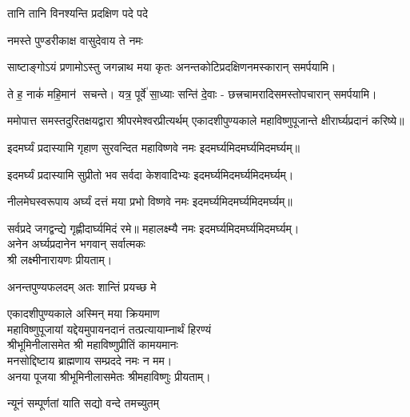\begin{center}
{तानि तानि विनश्यन्ति प्रदक्षिण पदे पदे}

{नमस्ते पुण्डरीकाक्ष वासुदेवाय ते नमः}

{साष्टाङ्गोऽयं प्रणामोऽस्तु जगन्नाथ मया कृतः}
अनन्तकोटिप्रदक्षिणनमस्कारान् समर्पयामि।\medskip

{ते ह॒ नाकं॑ महि॒मान॑ सचन्ते। यत्र॒ पूर्वे॑ सा॒ध्याः सन्ति॑ दे॒वाः}
- छत्त्रचामरादिसमस्तोपचारान् समर्पयामि।\medskip

ममोपात्त समस्तदुरितक्षयद्वारा श्रीपरमेश्वरप्रीत्यर्थम् एकादशीपुण्यकाले  महाविष्णुपूजान्ते क्षीरार्घ्यप्रदानं करिष्ये॥
\medskip

{इदमर्घ्यं प्रदास्यामि गृहाण सुरवन्दित}
	महाविष्णवे नमः इदमर्घ्यमिदमर्घ्यमिदमर्घ्यम्॥\medskip

{इदमर्घ्यं प्रदास्यामि सुप्रीतो भव सर्वदा}
	केशवादिभ्यः इदमर्घ्यमिदमर्घ्यमिदमर्घ्यम्।\medskip

{नीलमेघस्वरूपाय अर्घ्यं दत्तं मया प्रभो}
	विष्णवे नमः इदमर्घ्यमिदमर्घ्यमिदमर्घ्यम्॥\medskip

{सर्वप्रदे जगद्वन्द्ये गृह्णीदार्घ्यमिदं रमे॥}
	महालक्ष्म्यै नमः इदमर्घ्यमिदमर्घ्यमिदमर्घ्यम्।\\
अनेन अर्घ्यप्रदानेन भगवान् सर्वात्मकः\\ श्री लक्ष्मीनारायणः प्रीयताम्।\medskip

{अनन्तपुण्यफलदम् अतः शान्तिं प्रयच्छ मे}

एकादशीपुण्यकाले अस्मिन् मया क्रियमाण\\
महाविष्णुपूजायां यद्देयमुपायनदानं तत्प्रत्यायाम्नार्थं हिरण्यं\\
श्रीभूमिनीलासमेत श्री महाविष्णुप्रीतिं कामयमानः\\
मनसोद्दिष्टाय ब्राह्मणाय सम्प्रददे नमः न मम।\\ 
अनया पूजया श्रीभूमिनीलासमेतः श्रीमहाविष्णुः प्रीयताम्। 
 

{न्यूनं सम्पूर्णतां याति सद्यो वन्दे तमच्युतम्}


\end{center}
